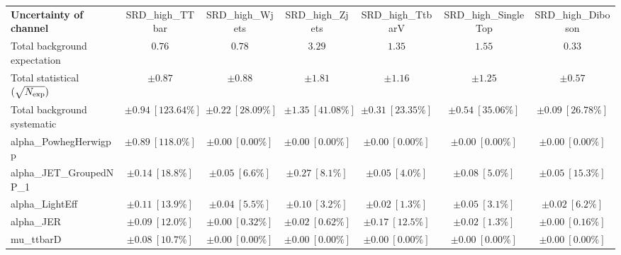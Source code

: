 
\begin{sidewaystable}
\begin{center}
\setlength{\tabcolsep}{0.0pc}
\begin{tabular*}{\textwidth}{@{\extracolsep{\fill}}lcccccc}
\noalign{\smallskip}\hline\noalign{\smallskip}
{\bf Uncertainty of channel}                                    & SRD\_high\_TTbar            & SRD\_high\_Wjets            & SRD\_high\_Zjets            & SRD\_high\_TtbarV            & SRD\_high\_SingleTop            & SRD\_high\_Diboson            \\
\noalign{\smallskip}\hline\noalign{\smallskip}
Total background expectation             &  $0.76$        &  $0.78$        &  $3.29$        &  $1.35$        &  $1.55$        &  $0.33$       \\
\noalign{\smallskip}\hline\noalign{\smallskip}
Total statistical $(\sqrt{N_{\rm exp}})$              & $\pm 0.87$        & $\pm 0.88$        & $\pm 1.81$        & $\pm 1.16$        & $\pm 1.25$        & $\pm 0.57$       \\
Total background systematic               & $\pm 0.94\ [123.64\%] $        & $\pm 0.22\ [28.09\%] $        & $\pm 1.35\ [41.08\%] $        & $\pm 0.31\ [23.35\%] $        & $\pm 0.54\ [35.06\%] $        & $\pm 0.09\ [26.78\%] $             \\
\noalign{\smallskip}\hline\noalign{\smallskip}
\noalign{\smallskip}\hline\noalign{\smallskip}
alpha\_PowhegHerwigpp         & $\pm 0.89\ [118.0\%] $          & $\pm 0.00\ [0.00\%] $          & $\pm 0.00\ [0.00\%] $          & $\pm 0.00\ [0.00\%] $          & $\pm 0.00\ [0.00\%] $          & $\pm 0.00\ [0.00\%] $       \\
alpha\_JET\_GroupedNP\_1         & $\pm 0.14\ [18.8\%] $          & $\pm 0.05\ [6.6\%] $          & $\pm 0.27\ [8.1\%] $          & $\pm 0.05\ [4.0\%] $          & $\pm 0.08\ [5.0\%] $          & $\pm 0.05\ [15.3\%] $       \\
alpha\_LightEff         & $\pm 0.11\ [13.9\%] $          & $\pm 0.04\ [5.5\%] $          & $\pm 0.10\ [3.2\%] $          & $\pm 0.02\ [1.3\%] $          & $\pm 0.05\ [3.1\%] $          & $\pm 0.02\ [6.2\%] $       \\
alpha\_JER         & $\pm 0.09\ [12.0\%] $          & $\pm 0.00\ [0.32\%] $          & $\pm 0.02\ [0.62\%] $          & $\pm 0.17\ [12.5\%] $          & $\pm 0.02\ [1.3\%] $          & $\pm 0.00\ [0.16\%] $       \\
mu\_ttbarD         & $\pm 0.08\ [10.7\%] $          & $\pm 0.00\ [0.00\%] $          & $\pm 0.00\ [0.00\%] $          & $\pm 0.00\ [0.00\%] $          & $\pm 0.00\ [0.00\%] $          & $\pm 0.00\ [0.00\%] $       \\

\end{tabular*}
\end{center}
\end{sidewaystable}
